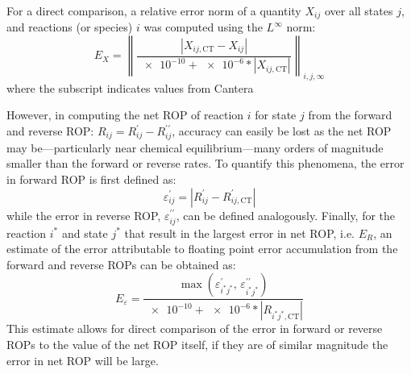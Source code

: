 \documentclass[12pt,number,sort&compress,preprint]{elsarticle}
\begin{document}
For a direct comparison, a relative error norm of a quantity $X_{ij}$ over all states $j$, and reactions (or species) $i$ was computed using the $L^{\infty}$ norm:
\begin{equation}
E_{X} = \left\lVert \frac{\left\lvert X_{ij,\text{CT}} - X_{ij}\right\rvert}{\num{e-10} + \num{e-6} * \left\lvert X_{ij,\text{CT}} \right\rvert} \right\rVert_{i,j,\infty}
\label{e:rel_err}
\end{equation}
where the  subscript indicates values from Cantera~\cite{Cantera}

However, in computing the net ROP of reaction $i$ for state $j$ from the forward and reverse ROP: $R_{ij} = R_{ij}^{\prime} - R_{ij}^{\prime\prime}$, accuracy can easily be lost as the net ROP may be---particularly near chemical equilibrium---many orders of magnitude smaller than the forward or reverse rates.
To quantify this phenomena, the error in forward ROP is first defined as:
\begin{equation}
\varepsilon^{\prime}_{ij} = \left\lvert R_{ij}^{\prime} - R_{ij,\text{CT}}^{\prime} \right\rvert
\end{equation}
while the error in reverse ROP, $\varepsilon^{\prime\prime}_{ij}$, can be defined analogously.
Finally, for the reaction $i^{*}$ and state $j^{*}$ that result in the largest error in net ROP, i.e. $E_{R}$, an estimate of the error attributable to floating point error accumulation from the forward and reverse ROPs can be obtained as:
\begin{equation}
E_{\varepsilon} = \frac{\max(\varepsilon^{\prime}_{i^{*}j^{*}}\text{, }\varepsilon^{\prime\prime}_{i^{*}j^{*}})}{\num{e-10} + \num{e-6} * \left\lvert R_{i^{*}j^{*},\text{CT}} \right\rvert}
\end{equation}
This estimate allows for direct comparison of the error in forward or reverse ROPs to the value of the net ROP itself, if they are of similar magnitude the error in net ROP will be large.
\end{document}
